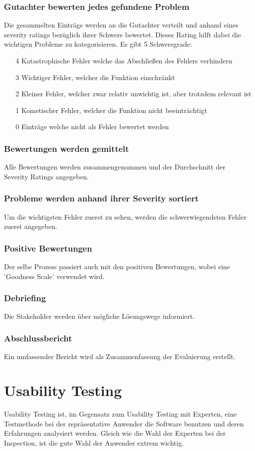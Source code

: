 \documentclass{article}
\begin{document}
	\subsubsection{Gutachter bewerten jedes gefundene Problem}
	Die gesammelten Einträge werden an die Gutachter verteilt und anhand eines severity ratings bezüglich ihrer Schwere bewertet. Dieses Rating hilft dabei die wichtigen Probleme zu kategorisieren. Es gibt 5 Schweregrade:
	\begin{enumerate}
		\item[4]{Katastrophische Fehler welche das Abschließen des Fehlers verhindern}
		\item[3]{Wichtiger Fehler, welcher die Funktion einschränkt}
		\item[2]{Kleiner Fehler, welcher zwar relativ unwichtig ist, aber trotzdem relevant ist}
		\item[1]{Kometischer Fehler, welcher die Funktion nicht beeinträchtigt}
		\item[0]{Einträge welche nicht als Fehler bewertet werden}
	\end{enumerate}
	\subsubsection{Bewertungen werden gemittelt}
	Alle Bewertungen werden zusammengenommen und der Durchschnitt der Severity Ratings angegeben.
	\subsubsection{Probleme werden anhand ihrer Severity sortiert}
	Um die wichtigsten Fehler zuerst zu sehen, werden die schwerwiegendsten Fehler zuerst angegeben.
	\subsubsection{Positive Bewertungen}
	Der selbe Prozess passiert auch mit den positiven Bewertungen, wobei eine 'Goodness Scale' verwendet wird.
	\subsubsection{Debriefing}
	Die Stakeholder werden über mögliche Lösungswege informiert.
	\subsubsection{Abschlussbericht}
	Ein umfassender Bericht wird als Zusammenfassung der Evaluierung erstellt.
	\section{Usability Testing}
	Usability Testing ist, im Gegensatz zum Usability Testing mit Experten, eine Testmethode bei der repräsentative Anwender die Software benutzen und deren Erfahrungen analysiert werden. Gleich wie die Wahl der Experten bei der Inspection, ist die gute Wahl der Anwender extrem wichtig.
\end{document}
